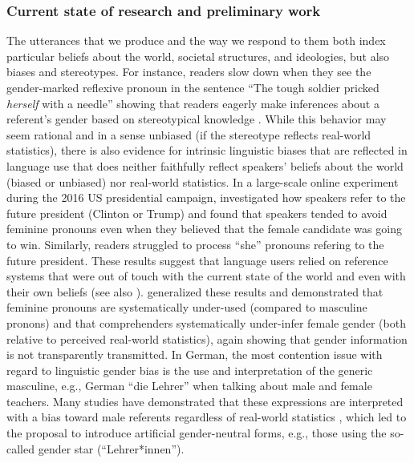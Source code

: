 \documentclass[11pt]{article}
\begin{document}
\subsubsection{Current state of research and preliminary work}


The utterances that we produce and the way we respond to them both index particular beliefs about the world, societal structures, and ideologies, but also biases and stereotypes.  For instance, readers slow down when they see the gender-marked reflexive pronoun in the sentence “The tough soldier pricked \textit{herself} with a needle” showing that readers eagerly make inferences about a referent’s gender based on stereotypical knowledge \parencite{Sturt2003, KennisonTrofe2003}.  While this behavior may seem rational and in a sense unbiased (if the stereotype reflects real-world statistics), there is also evidence for intrinsic linguistic biases that are reflected in language use that does neither faithfully reflect speakers’ beliefs about the world (biased or unbiased) nor real-world statistics.  In a large-scale online experiment during the 2016 US presidential campaign, \textcite{MalsburgEtAl2020} investigated how speakers refer to the future president (Clinton or Trump) and found that speakers tended to avoid feminine pronouns even when they believed that the female candidate was going to win.  Similarly, readers struggled to process “she” pronouns refering to the future president.  These results suggest that language users relied on reference systems that were out of touch with the current state of the world and even with their own beliefs (see also \cite{PozniakBurnett2021, PoppelsEtAl2021CUNY}).  \textcite{BoyceEtAl2019LSA} generalized these results and demonstrated that feminine pronouns are systematically under-used (compared to masculine pronons) and that comprehenders systematically under-infer female gender (both relative to perceived real-world statistics), again showing that gender information is not transparently transmitted.  In German, the most contention issue with regard to linguistic gender bias is the use and interpretation of the generic masculine, e.g., German “die Lehrer” when talking about male and female teachers.  Many studies have demonstrated that these expressions are interpreted with a bias toward male referents regardless of real-world statistics \parencite[e.g.,][]{GygaxEtAl2008}, which led to the proposal to introduce artificial gender-neutral forms, e.g., those using the so-called gender star (“Lehrer*innen”).
\end{document}
